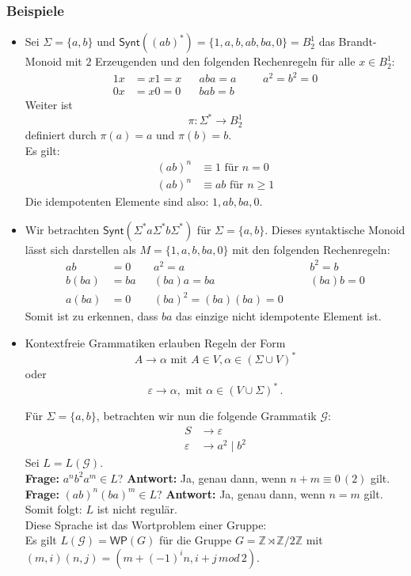\documentclass[12pt, german]{article}
\newcommand{\Z}{\mathbb{Z}}
\newcommand{\sigstern}{\Sigma^\ast}
\newcommand{\synt}{\mathsf{Synt}}
\begin{document}
	\subsubsection{Beispiele} 
	\begin{itemize}
		\item Sei $\Sigma = \{a, b\}$ und $\synt((ab)^\ast) = \{1, a ,b , ab, ba, 0\} = B^1_2$ das Brandt-Monoid mit $2$ Erzeugenden und den folgenden Rechenregeln für alle $x \in B^1_2$: 
		\begin{align*}
			1x &= x1 = x   &&aba = a  &&&a^2=b^2 = 0\\
			0x &= x0 = 0   &&bab = b 
		\end{align*}
		Weiter ist $$\pi: \sigstern \to B^1_2$$ definiert durch $\pi(a) = a$ und $\pi(b) = b$. \\
		Es gilt:
		\begin{align*}
			(ab)^n &\equiv 1 \text{ für } n = 0 \\
			(ab)^n &\equiv ab \text{ für } n \geq 1 
		\end{align*} Die idempotenten Elemente sind also: $1, ab ,ba, 0$.
		\item Wir betrachten $\mathsf{Synt}(\Sigma^*a\Sigma^*b\Sigma^*)$ für $\Sigma= \{a,b\}$. Dieses syntaktische Monoid lässt sich darstellen als $M = \{1, a, b, ba, 0\}$ mit den folgenden Rechenregeln: 
		\begin{align*}
			ab &= 0    && a^2 = a &&&b^2 = b \\
			b(ba) &= ba   &&(ba)a = ba &&& (ba)b = 0 \\
			a(ba) &= 0  &&(ba)^2 = (ba)(ba) = 0
		\end{align*}
		Somit ist zu erkennen, dass $ba$ das einzige nicht idempotente Element ist. 
		\item Kontextfreie Grammatiken erlauben Regeln der Form $$A \to \alpha \text{ mit } A \in V, \alpha \in (\Sigma \cup V)^\ast$$ oder $$\varepsilon \to \alpha, \text{ mit } \alpha \in (V \cup \Sigma)^\ast\, .$$ 
		
		Für $\Sigma = \{a, b\}$, betrachten wir nun die folgende Grammatik $\mathscr{G}$:
		\begin{align*}
			S &\to \varepsilon \\ 
			\varepsilon &\to a^2 \mid b^2 
		\end{align*} 
		Sei $L=L(\mathscr{G})$.\\
		\textbf{Frage:} $a^nb^2a^m \in L$? 
		\newline
		\textbf{Antwort:} Ja, genau dann, wenn $n+m \equiv 0\, (2)$ gilt.\\
		\newline
		\textbf{Frage:} $(ab)^n(ba)^m \in L$? 
		\newline
		\textbf{Antwort:} Ja, genau dann, wenn $n=m$ gilt.\\
		\newline
		Somit folgt: $L$ ist nicht regulär.\\
		Diese Sprache ist das Wortproblem einer Gruppe:\\
		Es gilt $L(\mathscr{G})=\mathsf{WP}(G)$ für die Gruppe $G=\Z \rtimes \Z/2\Z$ mit $(m,i)(n,j) = (m+(-1)^in, i+j\, mod\, 2) $.
	\end{itemize}
	
\end{document}
